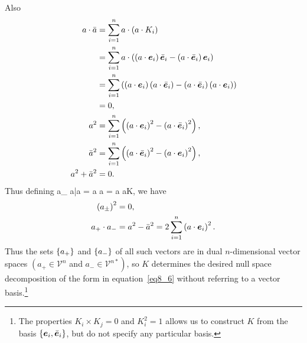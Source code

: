 Also
\begin{align}
	a\cdot\bar{a} &= \sum_{i=1}^{n} a\cdot\left ( {a\cdot K_{i}} \right ) \nonumber \\
	              &= \sum_{i=1}^{n} a\cdot\left ( {\left ( {a\cdot\bm{e}_{i}} \right )\bar{\bm{e}}_{i}
	                 -\left ( {a\cdot\bar{\bm{e}}_{i}} \right )\bm{e}_{i}} \right ) \nonumber \\
				  &= \sum_{i=1}^{n} \left ( {\left ( {a\cdot\bm{e}_{i}} \right )\left ( {a\cdot\bar{\bm{e}}_{i}} \right )
	                 -\left ( {a\cdot\bar{\bm{e}}_{i}} \right )\left ( {a\cdot\bm{e}_{i}} \right )} \right ) \nonumber \\
	              &= 0,	\\             
	a^{2} &= \sum_{i=1}^{n}\left ( {\left ( {a\cdot \bm{e}_{i}} \right )^{2}-\left ( {a\cdot \bar{\bm{e}}_{i}} \right )^{2}} \right ), \\
	\bar{a}^{2} &= \sum_{i=1}^{n}\left ( {\left ( {a\cdot \bar{\bm{e}}_{i}} \right )^{2}-\left ( {a\cdot \bm{e}_{i}} \right )^{2}} \right ), \\
	a^{2}+\bar{a}^{2} &= 0.
\end{align}
Thus defining
\be
	a_{\pm} \equiv a\pm\bar{a} = a \pm {}a = a \pm a\cdot K,
\ee
we have
\begin{align}
	\left ( {a_{\pm}} \right )^{2} &= 0, \\
	a_{+}\cdot a_{-} &= a^{2}-\bar{a}^{2} = 2\sum_{i=1}^{n}\left ( {a\cdot \bm{e}_{i}} \right )^{2}.
\end{align}
Thus the sets $\left \{ {a_{+}} \right \}$ and $\left \{ {a_{-}} \right \}$ of all such vectors are in dual $n$-dimensional 
vector spaces $\left (a_{+}\in \mathcal{V}^{n}\right .$ and $\left . a_{-}\in \mathcal{V}^{n*}\right )$, so $K$ 
determines the desired null space decomposition of the form in 
equation~\ref{eq8_6} without referring to a vector basis.\footnote{The properties 
$K_{i}\times K_{j} = 0$ and $K_{i}^{2}=1$ allows us to construct $K$ from the basis 
$\left \{ {\bm{e}_{i},\bar{\bm{e}}_{i}} \right \}$, but do not specify any particular basis.}

